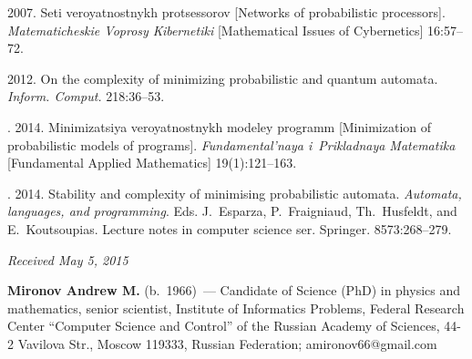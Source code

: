 \begin{multicols}{2}
{{\begin{thebibliography}{99}
2007. Seti veroyatnostnykh protsessorov [Networks of probabilistic processors].
\textit{Matematicheskie Voprosy Kibernetiki}
[Mathematical Issues of Cybernetics] 16:57--72.

2012. On the complexity of minimizing probabilistic and quantum automata.
\textit{Inform. Comput.} 218:36--53.

.
2014. Mini\-mi\-za\-tsiya veroyatnostnykh modeley programm
[Minimization of probabilistic models of programs].
\textit{Fundamental'naya i~Prikladnaya Matematika}
[Fundamental Applied Mathematics] 19(1):121--163.


.
2014. Stability and complexity of minimising probabilistic automata.
\textit{Automata, languages, and programming}.
Eds. J.~Esparza, P.~Fraigniaud, Th.~Husfeldt, and E.~Koutsoupias.
Lecture notes in computer science ser. Springer. 8573:268--279.



 \end{thebibliography}

 }
 }



\end{multicols}

\vspace*{-3pt}

\hfill{\small\textit{Received May 5, 2015}}


\Contrl

\noindent
\textbf{Mironov Andrew M.} (b.\ 1966)~---
Candidate of Science (PhD) in physics and mathematics,
senior scientist, Institute of Informatics Problems,
Federal Research Center ``Computer Science and Control'' of
the Russian Academy of Sciences, 44-2 Vavilova Str., Moscow 119333,
Russian Federation;  amironov66@gmail.com

\label{end\stat}


\renewcommand{\bibname}{\protect\rm Литература}